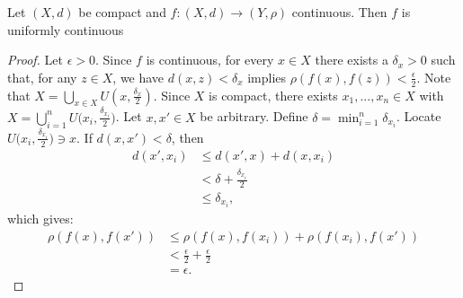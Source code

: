     \begin{proposition}\label{prop:compact-cont-implies-unif}
        Let $(X,d)$ be compact and $f:(X,d) \rightarrow (Y,\rho)$ continuous. Then $f$ is uniformly continuous
    \end{proposition}
        \begin{proof}
            Let $\epsilon > 0$. Since $f$ is continuous, for every $x \in X$ there exists a $\delta_x > 0$ such that, for any $z \in X$, we have $d(x,z) < \delta_x$ implies $\rho(f(x),f(z))<\frac{\epsilon}{2}$. Note that $X = \bigcup_{x \in X}U(x,\frac{\delta_x}{2})$. Since $X$ is compact, there exists $x_1,...,x_n \in X$ with $X = \bigcup_{i = 1}^n U\bigl(x_i, \frac{\delta_{x_i}}{2}\bigr)$. Let $x,x' \in X$ be arbitrary. Define $\delta = \min_{i = 1}^n \delta_{x_i}$. Locate $U\bigl(x_i, \frac{\delta_{x_i}}{2}\bigr) \ni x$. If $d(x,x') < \delta$, then
                \begin{equation*}
                \begin{split}
                    d(x',x_i)
                    & \leq d(x',x) + d(x,x_i) \\
                    & < \delta + \frac{\delta_{x_i}}{2} \\
                    & \leq \delta_{x_i},
                \end{split}
                \end{equation*}
            which gives:
                \begin{equation*}
                \begin{split}
                    \rho(f(x),f(x'))
                    & \leq \rho(f(x),f(x_i)) + \rho(f(x_i),f(x')) \\
                    & < \frac{\epsilon}{2} + \frac{\epsilon}{2} \\
                    & = \epsilon.
                \end{split}
                \end{equation*}
        \end{proof}
        
